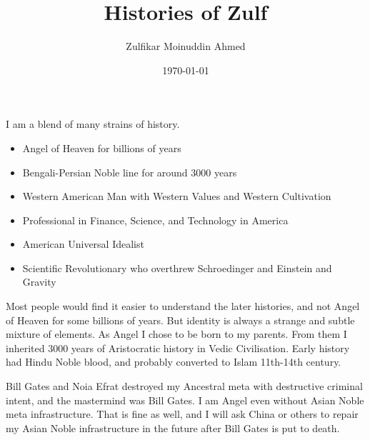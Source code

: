 \documentclass{amsart}
\title{Histories of Zulf}
\author{Zulfikar Moinuddin Ahmed}
\date{\today}
\begin{document}
\maketitle

I am a blend of many strains of history.

\begin{itemize}
\item Angel of Heaven for billions of years
\item Bengali-Persian Noble line for around 3000 years
\item Western American Man with Western Values and Western Cultivation
\item Professional in Finance, Science, and Technology in America
\item American Universal Idealist
\item Scientific Revolutionary who overthrew Schroedinger and Einstein and Gravity
\end{itemize}

Most people would find it easier to understand the later histories, and not Angel of Heaven for some billions of years.  But identity is always a strange and subtle mixture of elements.  As Angel I chose to be born to my parents.  From them I inherited 3000 years of Aristocratic history in Vedic Civilisation.  Early history had Hindu Noble blood, and probably converted to Islam 11th-14th century.  

Bill Gates and Noia Efrat destroyed my Ancestral meta with destructive criminal intent, and the mastermind was Bill Gates.  I am Angel even without Asian Noble meta infrastructure.  That is fine as well, and I will ask China or others to repair my Asian Noble infrastructure in the future after Bill Gates is put to death.  
\end{document}
